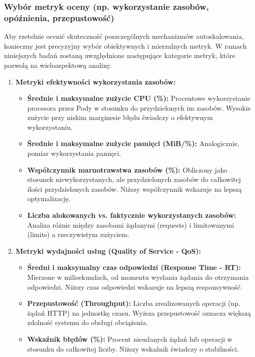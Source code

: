 \subsubsection{Wybór metryk oceny (np. wykorzystanie zasobów, opóźnienia, przepustowość)}
Aby rzetelnie ocenić skuteczność poszczególnych mechanizmów autoskalowania, konieczny jest precyzyjny wybór obiektywnych i mierzalnych metryk. W ramach niniejszych badań zostaną uwzględnione następujące kategorie metryk, które pozwolą na wieloaspektową analizę:

\begin{enumerate}
    \item \textbf{Metryki efektywności wykorzystania zasobów:}
    \begin{itemize}
        \item \textbf{Średnie i maksymalne zużycie CPU (\%):} Procentowe wykorzystanie procesora przez Pody w stosunku do przydzielonych im zasobów. Wysokie zużycie przy niskim marginesie błędu świadczy o efektywnym wykorzystaniu.
        \item \textbf{Średnie i maksymalne zużycie pamięci (MiB/\%):} Analogicznie, pomiar wykorzystania pamięci.
        \item \textbf{Współczynnik marnotrawstwa zasobów (\%):} Obliczony jako stosunek niewykorzystanych, ale przydzielonych zasobów do całkowitej ilości przydzielonych zasobów. Niższy współczynnik wskazuje na lepszą optymalizację.
        \item \textbf{Liczba alokowanych vs. faktycznie wykorzystanych zasobów:} Analiza różnic między zasobami żądanymi (requests) i limitowanymi (limits) a rzeczywistym zużyciem.
    \end{itemize}
    \item \textbf{Metryki wydajności usług (Quality of Service - QoS):}
    \begin{itemize}
        \item \textbf{Średni i maksymalny czas odpowiedzi (Response Time - RT):} Mierzone w milisekundach, od momentu wysłania żądania do otrzymania odpowiedzi. Niższy czas odpowiedzi wskazuje na lepszą responsywność.
        \item \textbf{Przepustowość (Throughput):} Liczba zrealizowanych operacji (np. żądań HTTP) na jednostkę czasu. Wyższa przepustowość oznacza większą zdolność systemu do obsługi obciążenia.
        \item \textbf{Wskaźnik błędów (\%):} Procent nieudanych żądań lub operacji w stosunku do całkowitej liczby. Niższy wskaźnik świadczy o stabilności.

\end{itemize}
\end{enumerate}
